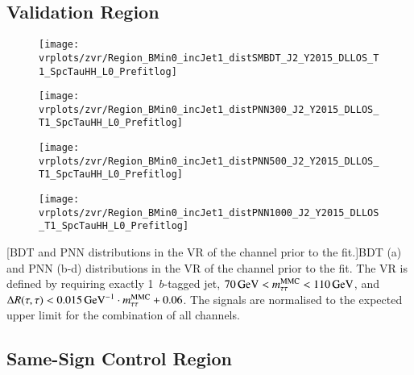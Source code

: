\subsection{\ZJets Validation Region}

{
  \centering

  \null\vfill


  \begin{subfigure}{0.495\textwidth}
    \centering

    \texttt{[image: vrplots/zvr/Region\_BMin0\_incJet1\_distSMBDT\_J2\_Y2015\_DLLOS\_T1\_SpcTauHH\_L0\_Prefitlog]}
    \subcaption{}
  \end{subfigure}\hfill%
  \begin{subfigure}{0.495\textwidth}
    \centering

    \texttt{[image: vrplots/zvr/Region\_BMin0\_incJet1\_distPNN300\_J2\_Y2015\_DLLOS\_T1\_SpcTauHH\_L0\_Prefitlog]}
    \subcaption{}
  \end{subfigure}

  \begin{subfigure}{0.495\textwidth}
    \centering

    \texttt{[image: vrplots/zvr/Region\_BMin0\_incJet1\_distPNN500\_J2\_Y2015\_DLLOS\_T1\_SpcTauHH\_L0\_Prefitlog]}
    \subcaption{}
  \end{subfigure}\hfill%
  \begin{subfigure}{0.495\textwidth}
    \centering

    \texttt{[image: vrplots/zvr/Region\_BMin0\_incJet1\_distPNN1000\_J2\_Y2015\_DLLOS\_T1\_SpcTauHH\_L0\_Prefitlog]}
    \subcaption{}
  \end{subfigure}

  [BDT and PNN distributions in the \Zjets VR of the \hadhad
  channel prior to the fit.]{BDT (a) and PNN (b-d) distributions in the \Zjets
    VR of the \hadhad channel prior to the fit. The \Zjets VR is defined by
    requiring exactly 1~$b$-tagged jet,
    $\SI{70}{\ensuremath{\text{GeV}}} < m_{\tau\tau}^\text{MMC} < \SI{110}{\ensuremath{\text{GeV}}}$, and
    $\dRtautau < \SI{0.015}{\per\GeV} \cdot \mMMC + 0.06$. The signals are
    normalised to the expected upper limit for the combination of all channels.}

  \null\vfill
}


\clearpage
\subsection{Same-Sign Control Region}

